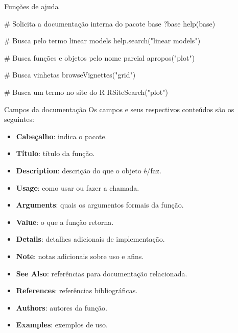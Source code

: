 \documentclass[
  ignorenonframetext,
  serif,
  professionalfont,
  usenames,
  dvipsnames,
  aspectratio = 169]{beamer}
\newenvironment{Shaded}{}{}
\newcommand{\CommentTok}[1]{\textcolor[rgb]{0.00,0.50,0.00}{#1}}
\newcommand{\FunctionTok}[1]{#1}
\newcommand{\NormalTok}[1]{#1}
\newcommand{\StringTok}[1]{\textcolor[rgb]{0.00,0.50,0.50}{#1}}
\providecommand{\tightlist}{%
  \setlength{\itemsep}{0pt}\setlength{\parskip}{0pt}}
\renewcommand{\tightlist}{%
  \setlength{\itemsep}{0\baselineskip}
  \setlength{\parskip}{0.25\baselineskip}
}
\renewenvironment{Shaded}{
    \vspace{2pt}
    \begin{tcolorbox}[
      boxrule=0pt,      %
      colframe=gray!10, %
      colback=gray!10,  %
      arc=1em,          %
      sharp corners,
      boxsep=0.5em,     %
      left=3pt, right=3pt, top=3pt, bottom=3pt, %
      grow to left by=0mm,
      grow to right by=6pt,
      ]
    }{
    \end{tcolorbox}
    \vspace{-3pt}
    }
\begin{document}
\begin{frame}[fragile]{Funções de ajuda}
\label{funuxe7uxf5es-de-ajuda-4}
\begin{Shaded}
\begin{Highlighting}[]
\CommentTok{\# Solicita a documentação interna do pacote base}
\NormalTok{?base}
\FunctionTok{help}\NormalTok{(base)}

\CommentTok{\# Busca pelo termo \textquotesingle{}linear models\textquotesingle{}}
\FunctionTok{help.search}\NormalTok{(}\StringTok{"linear models"}\NormalTok{)}

\CommentTok{\# Busca funções e objetos pelo nome parcial}
\FunctionTok{apropos}\NormalTok{(}\StringTok{"plot"}\NormalTok{)}

\CommentTok{\# Busca vinhetas}
\FunctionTok{browseVignettes}\NormalTok{(}\StringTok{"grid"}\NormalTok{)}

\CommentTok{\# Busca um termo no site do R}
\FunctionTok{RSiteSearch}\NormalTok{(}\StringTok{"plot"}\NormalTok{)}
\end{Highlighting}
\end{Shaded}
\end{frame}

\begin{frame}{Campos da documentação}
\label{campos-da-documentauxe7uxe3o}
Os campos e seus respectivos conteúdos são os seguintes:

\begin{itemize}
\tightlist
\item
  \textbf{Cabeçalho}: indica o pacote.
\item
  \textbf{Título}: título da função.
\item
  \textbf{Description}: descrição do que o objeto é/faz.
\item
  \textbf{Usage}: como usar ou fazer a chamada.
\item
  \textbf{Arguments}: quais os argumentos formais da função.
\item
  \textbf{Value}: o que a função retorna.
\item
  \textbf{Details}: detalhes adicionais de implementação.
\item
  \textbf{Note}: notas adicionais sobre uso e afins.
\item
  \textbf{See Also}: referências para documentação relacionada.
\item
  \textbf{References}: referências bibliográficas.
\item
  \textbf{Authors}: autores da função.
\item
  \textbf{Examples}: exemplos de uso.
\end{itemize}
\end{frame}
\end{document}
